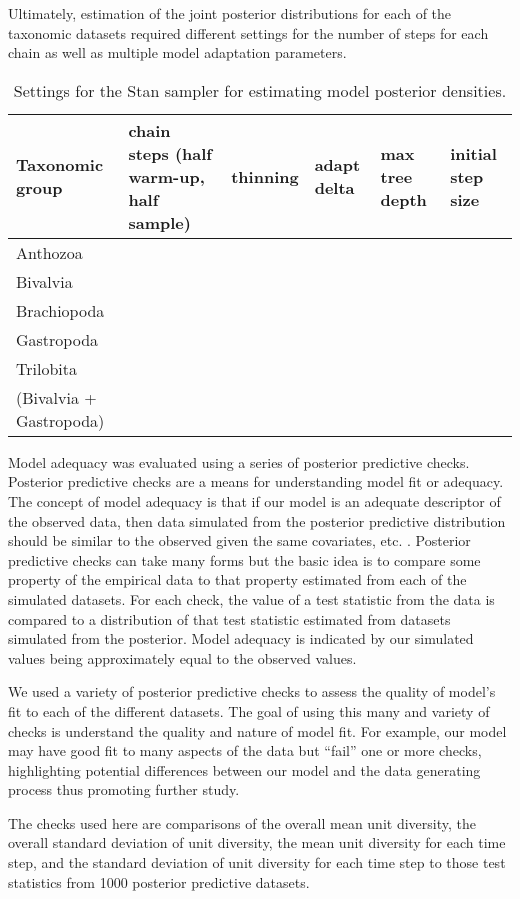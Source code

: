 \documentclass[12pt,letterpaper]{article}
\begin{document}
Ultimately, estimation of the joint posterior distributions for each of the taxonomic datasets required different settings for the number of steps for each chain as well as multiple model adaptation parameters.

\begin{table}
  \centering
  \begin{tabular}{ l l l l l l }
    Taxonomic group & chain steps (half warm-up, half sample) & thinning & adapt delta & max tree depth & initial step size \\
    \hline
    Anthozoa & & & & & \\
    Bivalvia & & & & & \\
    Brachiopoda & & & & & \\
    Gastropoda & & & & & \\
    Trilobita & & & & & \\
    (Bivalvia + Gastropoda) & & & & & \\
  \end{tabular}
  \caption{Settings for the Stan sampler for estimating model posterior densities.}
  \label{tab:sampler}
\end{table}


Model adequacy was evaluated using a series of posterior predictive checks. Posterior predictive checks are a means for understanding model fit or adequacy. The concept of model adequacy is that if our model is an adequate descriptor of the observed data, then data simulated from the posterior predictive distribution should be similar to the observed given the same covariates, etc. \citep{Gelman2013d}. Posterior predictive checks can take many forms but the basic idea is to compare some property of the empirical data to that property estimated from each of the simulated datasets. For each check, the value of a test statistic from the data is compared to a distribution of that test statistic estimated from datasets simulated from the posterior. Model adequacy is indicated by our simulated values being approximately equal to the observed values.

We used a variety of posterior predictive checks to assess the quality of model's fit to each of the different datasets. The goal of using this many and variety of checks is understand the quality and nature of model fit. For example, our model may have good fit to many aspects of the data but ``fail'' one or more checks, highlighting potential differences between our model and the data generating process thus promoting further study.

The checks used here are comparisons of the overall mean unit diversity, the overall standard deviation of unit diversity, the mean unit diversity for each time step, and the standard deviation of unit diversity for each time step to those test statistics from 1000 posterior predictive datasets. 
\end{document}
